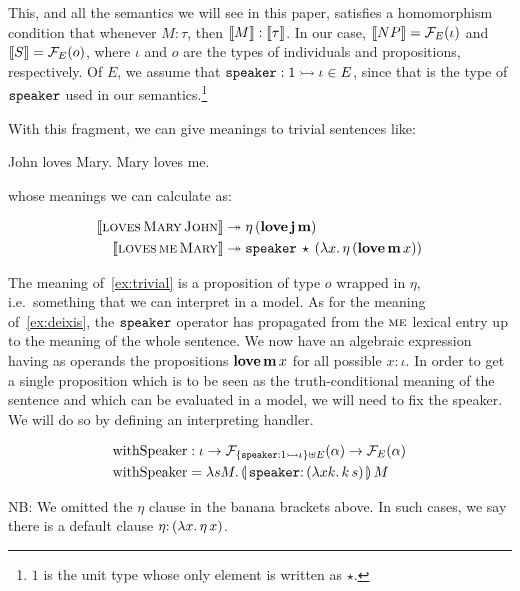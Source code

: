 \documentclass{llncs}
\newcommand{\negSpaceBeforeAlign}{\vspace{-4mm}}
\begin{document}
This, and all the semantics we will see in this paper, satisfies a
homomorphism condition that whenever $M : \tau$, then $\llbracket M \rrbracket :
\llbracket \tau \rrbracket$. In our case, $\llbracket NP \rrbracket = \mathcal{F}_E(\iota)$ and $\llbracket S \rrbracket =
\mathcal{F}_E(o)$, where $\iota$ and $o$ are the types of individuals and
propositions, respectively. Of $E$, we assume that
$\mathtt{speaker} : 1 \rightarrowtail \iota \in E$, since that is the type of
$\mathtt{speaker}$ used in our semantics.\footnote{$1$ is the unit type whose
  only element is written as $\star$.}

With this fragment, we can give meanings to trivial sentences like:

\begin{exe}
  \ex John loves Mary. \label{ex:trivial}
  \ex Mary loves me. \label{ex:deixis}
\end{exe}

whose meanings we can calculate as:

\negSpaceBeforeAlign

\begin{align}
  \llbracket \textsc{loves}\,\textsc{Mary}\,\textsc{John} \rrbracket & \twoheadrightarrow 
  \eta\,(\textbf{love}\,\textbf{j}\,\textbf{m}) \\
  \llbracket \textsc{loves}\,\textsc{me}\,\textsc{Mary} \rrbracket & \twoheadrightarrow
  \mathtt{speaker}\,\star\,(\lambda x.\, \eta\,(\textbf{love}\,\textbf{m}\,x))
\end{align}

The meaning of~\eqref{ex:trivial} is a proposition of type $o$ wrapped in
$\eta$, i.e.\ something that we can interpret in a model. As for the
meaning of~\eqref{ex:deixis}, the $\mathtt{speaker}$ operator has propagated
from the $\textsc{me}$ lexical entry up to the meaning of the whole
sentence. We now have an algebraic expression having as operands the
propositions $\textbf{love}\,\textbf{m}\,x$ for all possible $x :
\iota$. In order to get a single proposition which is to be seen as the
truth-conditional meaning of the sentence and which can be evaluated in a
model, we will need to fix the speaker. We will do so by defining an
interpreting handler.

\negSpaceBeforeAlign

\begin{align*}
  \withSpeaker &: \iota \to \FF_{\{\typedop{speaker}{1}{\iota}\} \uplus
    E}(\alpha) \to \FF_E(\alpha) \\
  \withSpeaker &= \lam{s M}{\ap{\banana{\onto{\op{speaker}}{(\lam{x k}{\ap{k}{s}})}}}{M}}
\end{align*}

NB: We omitted the $\eta$ clause in the banana brackets above. In such
cases, we say there is a default clause $\onto{\eta}{(\lam{x}{\etaE{x}})}$.
\end{document}

